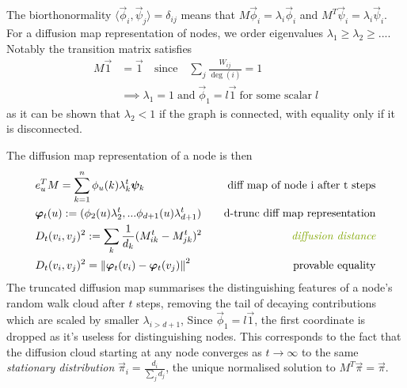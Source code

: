 The biorthonormality $\langle \vec{\phi}_i, \vec{\psi}_j \rangle = \delta_{ij}$ means that $M \vec{\phi}_i = \lambda_i \vec{\phi}_i$ and $M^T \vec{\psi}_i = \lambda_i \vec{\psi}_i$. For a diffusion map representation of nodes, we order eigenvalues $\lambda_1 \geq \lambda_2 \geq ...$.
Notably the transition matrix satisfies 
\begin{align}
M\vec{1} &= \vec{1} \quad \text{since}\quad \sum_j \frac{W_{ij}}{\deg(i)} = 1
\\
&\implies \lambda_1 = 1\; \text{and} \; \vec{\phi}_1 = l \vec{1} \;\text{for some scalar}\; l
\end{align}
as it can be shown that $\lambda_2 < 1$ if the graph is connected, with equality only if it is disconnected.

The diffusion map representation of a node is then
\begin{align*}
  & e_u^T M = \sum_{k=1}^n \phi_u(k) \lambda_k^t \vec{\psi}_k \quad & \text{diff map of node i after t steps}\\
  & \vec{\varphi}_t(u) := (\phi_2(u) \lambda_2^t,... \phi_{d+1}(u) \lambda_{d+1}^t) 
  \quad & \text{d-trunc diff map representation}
  \\
  & D_t(v_i, v_j)^2 := \sum_k \frac{1}{d_k} (M^t_{ik} - M^t_{jk})^2
  \quad & \text{\textit{diffusion distance}}
  \\
  & D_t(v_i, v_j)^2 = \norm{\vec{\varphi}_t(v_i) - \vec{\varphi}_t(v_j)}^2
  \quad & \text{provable equality}
\end{align*}
%
The truncated diffusion map summarises the distinguishing features of a node's random walk cloud after $t$ steps, removing the tail of decaying contributions which are scaled by smaller $\lambda_{i > d+1}$,
Since $\vec{\phi}_1 = l \vec{1}$, the first coordinate is dropped as it's useless for distinguishing nodes. This corresponds to the fact that the diffusion cloud starting at any node converges as $t \to \infty$ to the same \textit{stationary distribution} $\vec{\pi}_i = \frac{d_i}{\sum_j d_j}$, the unique normalised solution to $M^T \vec{\pi} = \vec{\pi}$.

